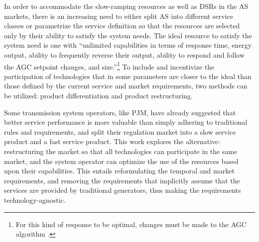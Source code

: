 In order to accommodate the slow-ramping resources as well as DSRs in the AS markets, there is an increasing need to either split AS into different service classes or parametrize the service definition so that the resources are selected only by their ability to satisfy the system needs. The ideal resource to satisfy the system need is one with ``unlimited capabilities in terms of response time, energy output, ability to frequently reverse their output, ability to respond and follow the AGC setpoint changes, and size.''\cite{makarov2008assessing}\footnote{For this kind of response to be optimal, changes must be made to the AGC algorithm \cite{peydayesh2012effects}.} To include and incentivize the participation of technologies that in some parameters are closer to the ideal than those defined by the current service and market requirements, two methods can be utilized: product differentiation and product restructuring.

Some transmission system operators, like PJM, have already suggested that better service performance is more valuable than simply adhering to traditional rules and requirements, and split their regulation market into a slow service product and a fast service product. 
This work explores the alternative: restructuring the market so that all technologies can participate in the same market, and the system operator can optimize the use of the resources based upon their capabilities. This entails reformulating the temporal and market requirements, and removing the requirements that implicitly assume that the services are provided by traditional generators, thus making the requirements technology-agnostic. %


 